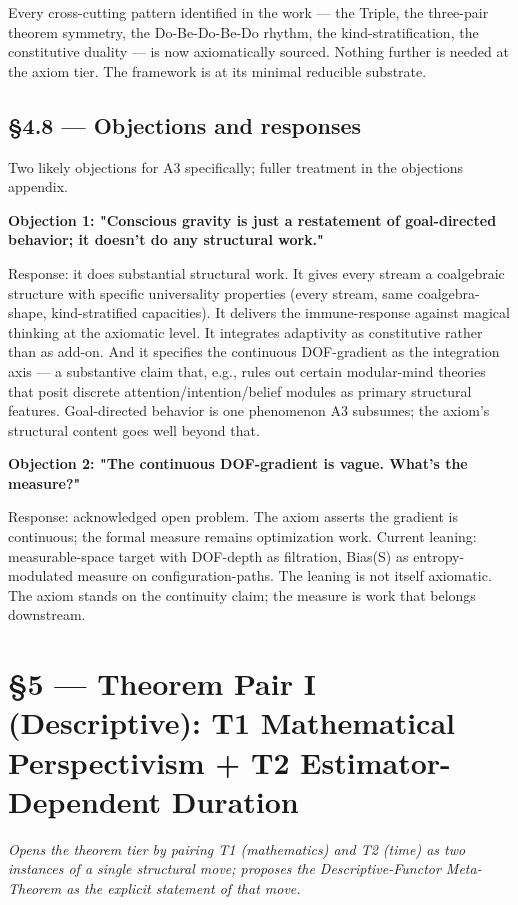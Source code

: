 \documentclass[11pt, openany]{book}
\newcommand{\sectionbreak}{\clearpage}
\begin{document}
Every cross-cutting pattern identified in the work --- the Triple, the three-pair theorem symmetry, the Do-Be-Do-Be-Do rhythm, the kind-stratification, the constitutive duality --- is now axiomatically sourced. Nothing further is needed at the axiom tier. The framework is at its minimal reducible substrate.

\sectionbreak

\section{§4.8 --- Objections and responses}

Two likely objections for A3 specifically; fuller treatment in the objections appendix.

\textbf{Objection 1: "Conscious gravity is just a restatement of goal-directed behavior; it doesn't do any structural work."}

Response: it does substantial structural work. It gives every stream a coalgebraic structure with specific universality properties (every stream, same coalgebra-shape, kind-stratified capacities). It delivers the immune-response against magical thinking at the axiomatic level. It integrates adaptivity as constitutive rather than as add-on. And it specifies the continuous DOF-gradient as the integration axis --- a substantive claim that, e.g., rules out certain modular-mind theories that posit discrete attention/intention/belief modules as primary structural features. Goal-directed behavior is one phenomenon A3 subsumes; the axiom's structural content goes well beyond that.

\textbf{Objection 2: "The continuous DOF-gradient is vague. What's the measure?"}

Response: acknowledged open problem. The axiom asserts the gradient is continuous; the formal measure remains optimization work. Current leaning: measurable-space target with DOF-depth as filtration, Bias(S) as entropy-modulated measure on configuration-paths. The leaning is not itself axiomatic. The axiom stands on the continuity claim; the measure is work that belongs downstream.

\chapter{§5 — Theorem Pair I (Descriptive): T1 Mathematical Perspectivism + T2 Estimator-Dependent Duration}


\textit{Opens the theorem tier by pairing T1 (mathematics) and T2 (time) as two instances of a single structural move; proposes the Descriptive-Functor Meta-Theorem as the explicit statement of that move.}
\end{document}
